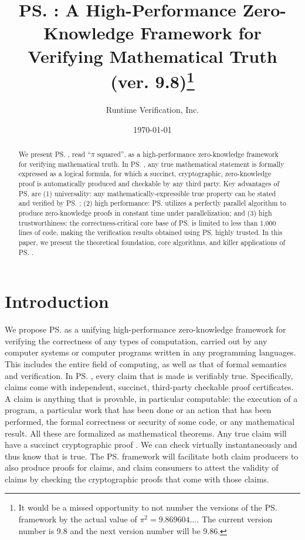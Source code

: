 \documentclass{article}
\title{\ps: A High-Performance Zero-Knowledge Framework for Verifying
Mathematical Truth\\\Large(ver. 9.8)\footnote{It would be a missed opportunity to not number the versions of the \ps framework by
the actual value of $\pi^2 = 9.869604\ldots$. 
The current version number is 9.8
and the next version number will be 9.86.}}
\author{Runtime Verification, Inc.}
\date{\today}
\begin{document}
\maketitle

\begin{abstract}
We present \ps, read ``$\pi$ squared'',
as a high-performance zero-knowledge framework
for verifying mathematical truth. 
In \ps, 
any true mathematical statement is formally expressed as a logical formula,
for which a succinct, cryptographic, zero-knowledge
proof is automatically produced and checkable by any third party. 
Key advantages of \ps are
(1) universality: any mathematically-expressible 
    true property can be stated and verified by \ps;
(2) high performance: \ps utilizes a perfectly parallel algorithm
    to produce zero-knowledge proofs in constant time under parallelization;
and (3) high trustworthiness: the correctness-critical core base 
        of \ps is limited to less than 1,000 lines of code, making
        the verification results obtained using \ps highly trusted. 
In this paper, we present the theoretical foundation, core algorithms, 
and killer applications of \ps. 
\end{abstract}

\section{Introduction}

We propose \ps 
as a unifying high-performance zero-knowledge framework
for verifying the correctness of any types of computation,
carried out by any computer systems or computer programs written 
in any programming languages. 
This includes the entire field
of computing, as well as that of formal semantics and verification.
In \ps, every claim that is made is verifiably true. 
Specifically, claims
come with independent, succinct, third-party checkable proof certificates. 
A
claim is anything that is provable, in particular computable: 
the execution of a
program, a particular work that has been done or an action that has been
performed, the formal correctness or security of some code, or any mathematical result. 
All these are formalized as mathematical theorems. 
Any true claim  will have a succinct
cryptographic proof . 
We can check  virtually instantaneously and thus know that  is true.
The \ps framework will facilitate both claim producers to also produce proofs for claims, and claim consumers
to attest the validity of claims by checking the cryptographic proofs that come with those claims.
\end{document}
